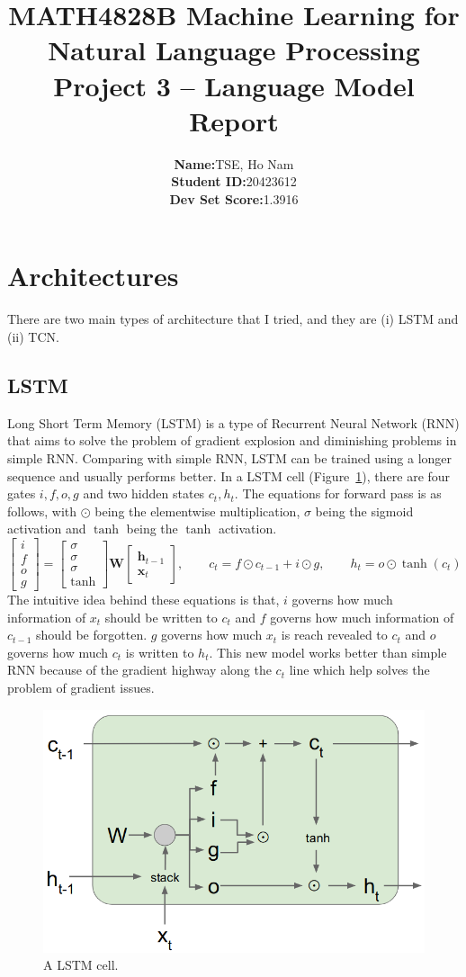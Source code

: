 \documentclass[12pt]{article}
\title{
  {\large MATH4828B Machine Learning for Natural Language Processing}\\
  \textbf{\large Project 3 -- Language Model}\\
  \textbf{Report}
  }
\author{ 
  \begin{tabular}{R{0.4\textwidth}L{0.4\textwidth}}
    \textbf{Name:} & TSE, Ho Nam \\
    \textbf{Student ID:} & 20423612 \\
    \textbf{Dev Set Score:} & 1.3916
  \end{tabular}
 }
\date{}
\newcommand{\mat}[1]{\mathbf{#1}}
\begin{document}
\maketitle\thispagestyle{fancy}
\tableofcontents
\section{Architectures}
There are two main types of architecture that I tried, and they are (i) LSTM and (ii) TCN.

\subsection{LSTM}
Long Short Term Memory (LSTM) is a type of Recurrent Neural Network (RNN) that aims to solve the problem of gradient explosion and diminishing problems in simple RNN. Comparing with simple RNN, LSTM can be trained using a longer sequence and usually performs better. In a LSTM cell (Figure~\ref{fig:LSTM}), there are four gates \(i, f, o, g\) and two hidden states \(c_t, h_t\). The equations for forward pass is as follows, with \(\odot\) being the elementwise multiplication, \(\sigma\) being the sigmoid activation and \(\tanh\) being the \(\tanh\) activation.
\[
	\begin{bmatrix}
		i \\ f \\ o \\ g
	\end{bmatrix}
	=
	\begin{bmatrix}
		\sigma \\ \sigma \\ \sigma \\ \tanh
	\end{bmatrix}
	\mat W
	\begin{bmatrix}
		\mat h_{t-1} \\ \mat x_t
	\end{bmatrix}
	,\qquad
	c_t = f \odot c_{t-1} + i \odot g
	,\qquad
	h_t = o \odot \tanh(c_t)
\]
The intuitive idea behind these equations is that, \(i\) governs how much information of \(x_t\) should be written to \(c_t\) and \(f\) governs how much information of \(c_{t-1}\) should be forgotten. \(g\) governs how much \(x_t\) is reach revealed to \(c_t\) and \(o\) governs how much \(c_t\) is written to \(h_t\). This new model works better than simple RNN because of the gradient highway along the \(c_t\) line which help solves the problem of gradient issues.

\begin{figure}[h!]
	\centering
	\includegraphics[width=0.5\linewidth]{LSTM}
	\caption{A LSTM cell.\protect\footnotemark}
	\label{fig:LSTM}
\end{figure}
\end{document}
